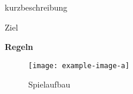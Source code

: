 
kurzbeschreibung

\begin{bclogo}[logo=\bcoutil]{Ziel}
\lipsum[1]
\end{bclogo}

\textbf{\large Regeln}\\
\lipsum[1]

\begin{figure}[h!]
    \centering
    \texttt{[image: example-image-a]}
    \caption{Spielaufbau}
    \label{fig:my_label}
\end{figure}